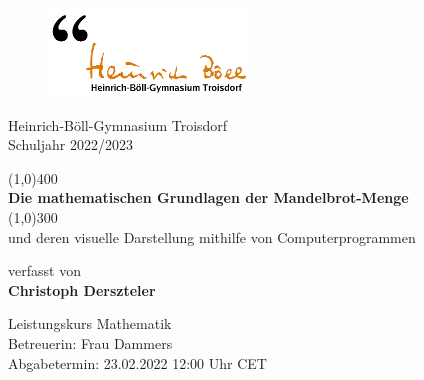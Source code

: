 \begin{center}
  \begin{figure}
    \vspace{-2cm}
    \hspace{-2cm}
    \includegraphics[scale=0.75]{images/heinrichboellgymnasium}
  \end{figure}

  \vspace{1cm}
  Heinrich-Böll-Gymnasium Troisdorf\\
  Schuljahr 2022/2023

  \vspace{1cm}
  \Huge
  \line(1,0){400}\\
  \textbf{Die mathematischen Grundlagen der Mandelbrot-Menge}\\
  \line(1,0){300}\\

  \vspace{0.75cm}
  \Large
  und deren visuelle Darstellung mithilfe von Computerprogrammen

  \vspace{2cm}
  \large
  verfasst von\\
  \Large
  \textbf{Christoph Derszteler}

  \vfill
  \large
  Leistungskurs Mathematik\\
  Betreuerin: Frau Dammers\\
  Abgabetermin: 23.02.2022 12:00 Uhr CET\\
\end{center}
\thispagestyle{empty}